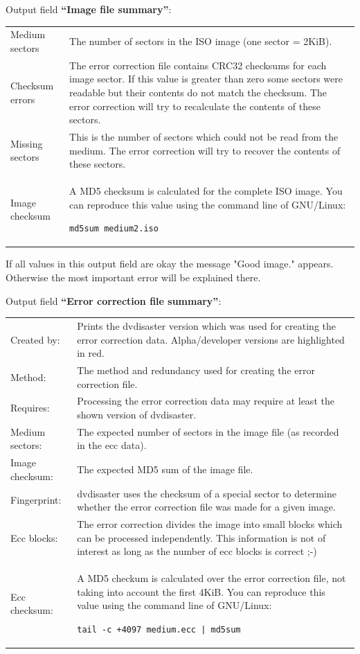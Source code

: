 \newpage

Output field {\bf ``Image file summary''}:

\medskip

\begin{tabular}{lp{125mm}}
  Medium sectors  & 
  The number of sectors in the ISO image (one sector = 2KiB). \\
  Checksum errors &
  The error correction file contains CRC32 checksums for each image sector. 
  If this value is greater than zero some sectors were readable but their 
  contents do not match the checksum. The error correction will try to 
  recalculate the contents of these sectors.  \\
  Missing sectors & 
  This is the number of sectors which could not be read from 
  the medium. The error correction will try to recover the contents of these sectors. \\
  Image checksum &
  A MD5 checksum is calculated for the complete ISO image. You can reproduce 
  this value using the command line of GNU/Linux: \par
  {\tt md5sum medium2.iso}
\end{tabular}

\medskip

If all values in this output field are okay the 
message "\textcolor{dkgreen}{Good image.}" appears. 
Otherwise the most important error will be explained there. 

\bigskip

Output field {\bf ``Error correction file summary''}:

\medskip

\begin{tabular}{lp{124mm}}
  Created by: &
  Prints the dvdisaster version which was used for creating the 
  error correction data. Alpha/developer versions are highlighted in red. \\
  Method: &
  The method and redundancy used for creating the error correction file. \\
  Requires: &
  Processing the error correction data may require at least the shown version of dvdisaster. \\
  Medium sectors: &
  The expected number of sectors in the image file (as recorded in the ecc data). \\
  Image checksum: &
  The expected MD5 sum of the image file. \\
  Fingerprint: &
  dvdisaster uses the checksum of a special sector to determine 
  whether the error correction file was made for a given image. \\
  Ecc blocks: &
  The error correction divides the image into small blocks which can 
  be processed independently. This information is not of interest as long 
  as the number of ecc blocks is correct ;-) \\ 
  Ecc checksum: &
  A MD5 checkum is calculated over the error correction file, not taking 
  into account the first 4KiB. You can reproduce this value using 
  the command line of GNU/Linux: \par
  {\tt tail -c +4097 medium.ecc | md5sum} \\
\end{tabular}

